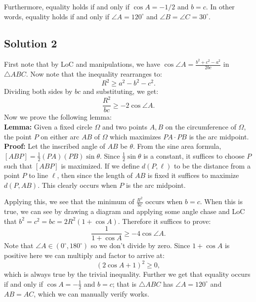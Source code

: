\documentclass{article}
\begin{document}
Furthermore, equality holds if and only if $\cos A = -1/2$ and $b = c$. In other words, equality holds if and only if $\angle A = 120^\circ$ and $\angle B = \angle C = 30^\circ$.

\subsection{Solution 2}

First note that by LoC and manipulations, we have $\cos \angle A=\frac{b^2+c^2-a^2}{2bc}$ in $\triangle ABC$. Now note that the inequality rearranges to:
$$R^2 \geq a^2-b^2-c^2.$$
Dividing both sides by $bc$ and substituting, we get:
$$\frac{R^2}{bc} \geq -2\cos \angle A.$$
Now we prove the following lemma:\\

\noindent\textbf{Lemma:} Given a fixed circle $\Omega$ and two points $A,B$ on the circumference of $\Omega$, the point $P$ on either arc $AB$ of $\Omega$ which maximizes $PA \cdot PB$ is the arc midpoint.\\
\textbf{Proof:} Let the inscribed angle of $AB$ be $\theta$. From the sine area formula, $[ABP]=\frac{1}{2}(PA)(PB)\sin \theta$. Since $\frac{1}{2}\sin \theta$ is a constant, it suffices to choose $P$ such that $[ABP]$ is maximized. If we define $d(P,\ell)$ to be the distance from a point $P$ to line $\ell$, then since the length of $AB$ is fixed it suffices to maximize $d(P,AB)$. This clearly occurs when $P$ is the arc midpoint.

Applying this, we see that the minimum of $\frac{R^2}{bc}$ occurs when $b=c$. When this is true, we can see by drawing a diagram and applying some angle chase and LoC that $b^2=c^2=bc=2R^2(1+\cos A)$. Therefore it suffices to prove:
$$\frac{1}{1+\cos A} \geq -4\cos \angle A.$$
Note that $\angle A \in (0^\circ,180^\circ)$ so we don't divide by zero. Since $1+\cos A$ is positive here we can multiply and factor to arrive at:
$$(2\cos A+1)^2 \geq 0,$$
which is always true by the trivial inequality. Further we get that equality occurs if and only if $\cos A=-\frac{1}{2}$ and $b=c$; that is $\triangle ABC$ has $\angle A=120^\circ$ and $AB=AC$, which we can manually verify works.
\end{document}
